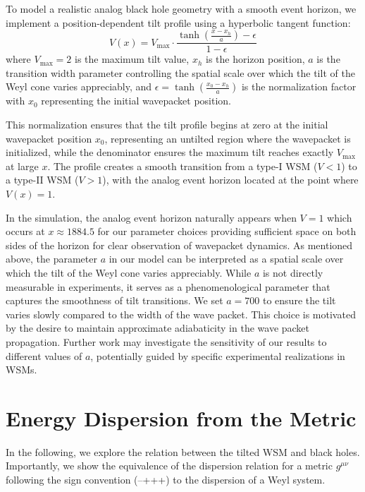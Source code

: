 \documentclass[%
 aip,
 amsmath,amssymb,
 reprint,%
]{revtex4-1}
\begin{document}
To model a realistic analog black hole geometry with a smooth event horizon, we implement a position-dependent tilt profile using a hyperbolic tangent function:
\begin{equation}
V(x) = V_{\text{max}} \cdot \frac{\tanh\left(\frac{x - x_h}{a}\right) - \epsilon}{1 - \epsilon}
\end{equation}
where $V_{\text{max}} = 2$ is the maximum tilt value, $x_h$ is the horizon position, $a$ is the transition width parameter controlling the spatial scale over which the tilt of the Weyl cone varies appreciably, and $\epsilon = \tanh\left(\frac{x_0 - x_h}{a}\right)$ is the normalization factor with $x_0$ representing the initial wavepacket position.

This normalization ensures that the tilt profile begins at zero at the initial wavepacket position $x_0$, representing an untilted region where the wavepacket is initialized, while the denominator ensures the maximum tilt reaches exactly $V_{\text{max}}$ at large $x$. The profile creates a smooth transition from a type-I WSM ($V < 1$) to a type-II WSM ($V > 1$), with the analog event horizon located at the point where $V(x) = 1$. 

In the simulation, the analog event horizon naturally appears when $V=1$ which occurs at $x\approx 1884.5$ for our parameter choices providing sufficient space on both sides of the horizon for clear observation of wavepacket dynamics. As mentioned above, the parameter $a$ in our model can be interpreted as a spatial scale over which the tilt of the Weyl cone varies appreciably. While $a$ is not directly measurable in experiments, it serves as a phenomenological parameter that captures the smoothness of tilt transitions. We set $a = 700$ to ensure the tilt varies slowly compared to the width of the wave packet. This choice  is motivated by the desire to maintain approximate adiabaticity in the wave packet propagation. Further work may investigate the sensitivity of our results to different values of $a$, potentially guided by specific experimental realizations in WSMs.

\section{\label{sec:energy-disp-metric}Energy Dispersion from the Metric}

In the following, we explore the relation between the tilted WSM  and black holes. Importantly, we show the equivalence of the dispersion relation for a metric $g^{\mu \nu}$ following the sign convention (--+++) to the dispersion of a Weyl system. 
\end{document}
